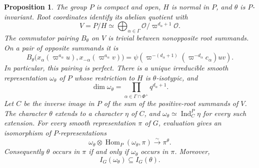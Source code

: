 \documentclass[10pt]{amsart}
\newtheorem{proposition}{Proposition}[section]
\newcommand{\Ocal}{\mathcal O}
\newcommand{\Hom}{\operatorname{Hom}}
\begin{document}
\begin{proposition}\label{prop:weighted-heisenberg}
The group $P$ is compact and open, $H$ is normal in $P$, and $\theta$ is
$P$-invariant. Root coordinates identify its abelian quotient with
\[
 V=P/H\simeq\bigoplus_{\alpha\in\Gamma}\Ocal/\varpi^{d_\alpha+1}\Ocal.
\]
The commutator pairing $B_\theta$ on $V$ is trivial between nonopposite root
summands. On a pair of opposite summands it is
\begin{equation}\label{eq:root-pairing}
 B_\theta\bigl(x_\alpha(\varpi^{a_\alpha}u),
                    x_{-\alpha}(\varpi^{a_\alpha}v)\bigr)
 =\psi\left(\varpi^{-(d_\alpha+1)}
                   (\varpi^{-d_\alpha}c_\alpha)uv\right).
\end{equation}
In particular, this pairing is perfect. There is a unique irreducible smooth
representation $\omega_\theta$ of $P$ whose restriction to $H$ is
$\theta$-isotypic, and
\[
 \dim\omega_\theta
   =\prod_{\alpha\in\Gamma\cap\Phi^+}q^{d_\alpha+1}.
\]
Let $C$ be the inverse image in $P$ of the sum of the positive-root summands
of $V$. The character $\theta$ extends to a character $\eta$ of $C$, and
$\omega_\theta\simeq\operatorname{Ind}_C^P\eta$ for every such extension.
For every smooth representation $\pi$ of $G$, evaluation gives an isomorphism
of $P$-representations
\begin{equation}\label{eq:occurrence}
 \omega_\theta\otimes
       \Hom_P(\omega_\theta,\pi)
       \xrightarrow{\sim}\pi^\theta.
\end{equation}
Consequently $\theta$ occurs in $\pi$ if and only if $\omega_\theta$ occurs in $\pi$.
Moreover,
\begin{equation}\label{eq:intertwining-inclusion}
 I_G(\omega_\theta)\subseteq I_G(\theta).
\end{equation}
\end{proposition}
\end{document}
